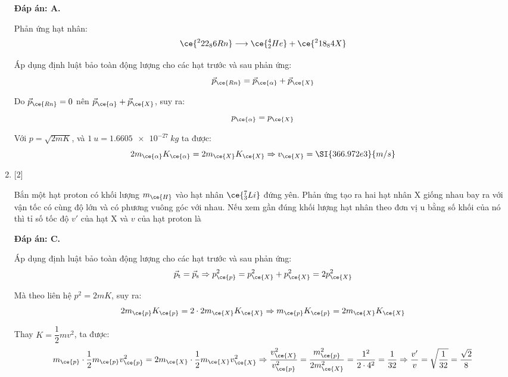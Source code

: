 \begin{enumerate}[label=\bfseries Câu \arabic*:]
	\loigiai
	{		\textbf{Đáp án: A.}
		
		Phản ứng hạt nhân:
		$$\ce{^222_86 Rn} \longrightarrow \ce{^4_2 He} + \ce{^218_84 X}$$
		
		Áp dụng định luật bảo toàn động lượng cho các hạt trước và sau phản ứng:
		$$\vec p_{\ce{Rn}} = \vec p_{\ce{\alpha}} + \vec p_{\ce{X}}$$
		
		Do $\vec p_{\ce{Rn}} = 0$ nên $\vec p_{\ce{\alpha}} + \vec p_{\ce{X}}$, suy ra:
		$$p_{\ce{\alpha}} = p_{\ce{X}}$$
		
		Với $p=\sqrt{2mK}$, và $\SI{1}{u} = \SI{1.6605e-27}{kg}$ ta được:
		$$2 m_{\ce{\alpha}} K_{\ce{\alpha}} = 2 m_{\ce{X}} K_{\ce{X}} \Rightarrow v_{\ce{X}} = \SI{366.972e3}{m/s}$$
	}
	\item {} [2]
	\cauhoi
	{Bắn một hạt proton có khối lượng $m_{\ce{H}}$ vào hạt nhân $\ce{^7_3 Li}$ đứng yên. Phản ứng tạo ra hai hạt nhân X giống nhau bay ra với vận tốc có cùng độ lớn và có phương vuông góc với nhau. Nếu xem gần đúng khối lượng hạt nhân theo đơn vị u bằng số khối của nó thì tỉ số tốc độ $v'$ của hạt X và $v$ của hạt proton là
	}
	
	\loigiai
	{		\textbf{Đáp án: C.}
		
		Áp dụng định luật bảo toàn động lượng cho các hạt trước và sau phản ứng:
		$$\vec p_{\text t} = \vec p_{\text s} \Rightarrow p_{\ce{p}}^2 = p_{\ce{X}}^2 + p_{\ce{X}}^2 = 2p_{\ce{X}}^2$$
		
		Mà theo liên hệ $p^2=2mK$, suy ra:
		$$2 m_{\ce{p}} K_{\ce{p}} = 2 \cdot 2 m_{\ce{X}} K_{\ce{X}} \Rightarrow m_{\ce{p}} K_{\ce{p}} = 2 m_{\ce{X}} K_{\ce{X}}$$
		
		Thay $K=\dfrac{1}{2} mv^2$, ta được:
		$$m_{\ce{p}} \cdot \dfrac{1}{2} m_{\ce{p}} v_{\ce{p}}^2 = 2 m_{\ce{X}} \cdot \dfrac{1}{2} m_{\ce{X}} v_{\ce{X}}^2 \Rightarrow \dfrac{v_{\ce{X}}^2}{v_{\ce{p}}^2} = \dfrac{m_{\ce{p}}^2}{2 m_{\ce{X}}^2} = \dfrac{1^2}{2 \cdot 4^2} = \dfrac{1}{32} \Rightarrow \dfrac{v'}{v} = \sqrt{\dfrac{1}{32}} = \dfrac{\sqrt 2}{8}$$
		
	}
	

\end{enumerate}
